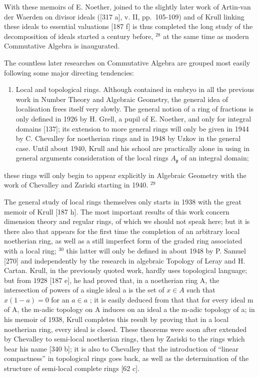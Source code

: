 With these memoirs of E. Noether, joined to the slightly later work of Artin-van der Waerden on divisor ideals ({[}317 a{]}, v. II, pp.~105-109) and of Krull linking these ideals to essential valuations {[}187 f{]} is thus completed the long study of the decomposition of ideals started a century before, \(^{28}\) at the same time as modern Commutative Algebra is inaugurated.

The countless later researches on Commutative Algebra are grouped most easily following some major directing tendencies:

\begin{enumerate}
\def\labelenumi{\Alph{enumi})}
\tightlist
\item
  Local and topological rings. Although contained in embryo in all the previous work in Number Theory and Algebraic Geometry, the general idea of localisation frees itself very slowly. The general notion of a ring of fractions is only defined in 1926 by H. Grell, a pupil of E. Noether, and only for integral domains {[}137{]}; its extension to more general rings will only be given in 1944 by C. Chevalley for noetherian rings and in 1948 by Uzkov in the general case. Until about 1940, Krull and his school are practically alone in using in general arguments consideration of the local rings \(A_{\mathfrak{p}}\) of an integral domain;
\end{enumerate}

these rings will only begin to appear explicitly in Algebraic Geometry with the work of Chevalley and Zariski starting in 1940. \(^{29}\)

The general study of local rings themselves only starts in 1938 with the great memoir of Krull {[}187 h{]}. The most important results of this work concern dimension theory and regular rings, of which we should not speak here; but it is there also that appears for the first time the completion of an arbitrary local noetherian ring, as well as a still imperfect form of the graded ring associated with a local ring; \(^{30}\) this latter will only be defined in about 1948 by P. Samuel {[}270{]} and independently by the research in algebraic Topology of Leray and H. Cartan. Krull, in the previously quoted work, hardly uses topological language; but from 1928 {[}187 e{]}, he had proved that, in a noetherian ring A, the intersection of powers of a single ideal a is the set of \(x \in A\) such that \(x(1 - a) = 0\) for an \(a \in a\) ; it is easily deduced from that that for every ideal m of A, the m-adic topology on A induces on an ideal a the m-adic topology of a; in his memoir of 1938, Krull completes this result by proving that in a local noetherian ring, every ideal is closed. These theorems were soon after extended by Chevalley to semi-local noetherian rings, then by Zariski to the rings which bear his name {[}340 b{]}; it is also to Chevalley that the introduction of ``linear compactness'' in topological rings goes back, as well as the determination of the structure of semi-local complete rings {[}62 c{]}.

